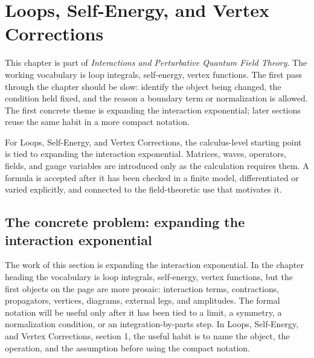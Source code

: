 \chapter{Loops, Self-Energy, and Vertex Corrections}


This chapter is part of \emph{Interactions and Perturbative Quantum Field Theory}.  The working vocabulary is loop integrals, self-energy, vertex functions.  The first pass through the chapter should be slow: identify the object being changed, the condition held fixed, and the reason a boundary term or normalization is allowed.  The first concrete theme is expanding the interaction exponential; later sections reuse the same habit in a more compact notation.

For Loops, Self-Energy, and Vertex Corrections, the calculus-level starting point is tied to expanding the interaction exponential.  Matrices, waves, operators, fields, and gauge variables are introduced only as the calculation requires them.  A formula is accepted after it has been checked in a finite model, differentiated or varied explicitly, and connected to the field-theoretic use that motivates it.

\section{The concrete problem: expanding the interaction exponential}













The work of this section is expanding the interaction exponential.  In the chapter heading the vocabulary is loop integrals, self-energy, vertex functions, but the first objects on the page are more prosaic: interaction terms, contractions, propagators, vertices, diagrams, external legs, and amplitudes.  The formal notation will be useful only after it has been tied to a limit, a symmetry, a normalization condition, or an integration-by-parts step.  In Loops, Self-Energy, and Vertex Corrections, section 1, the useful habit is to name the object, the operation, and the assumption before using the compact notation.

